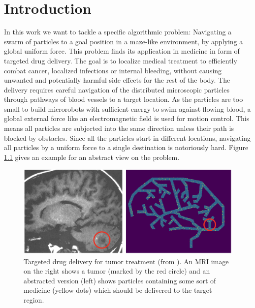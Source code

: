 \chapter{Introduction} \label{chp:Introduction}

 In this work we want to tackle a specific algorithmic problem: Navigating a swarm of particles to a goal position in a maze-like environment, by applying a global uniform force. This problem finds its application in medicine in form of targeted drug delivery. The goal is to localize medical treatment to efficiently combat cancer, localized infections or internal bleeding, without causing unwanted and potentially harmful side effects for the rest of the body. The delivery requires careful navigation of the distributed microscopic particles through pathways of blood vessels to a target location. As the particles are too small to build microrobots with sufficient energy to swim against flowing blood, a global external force like an electromagnetic field is used for motion control. This means all particles are subjected into the same direction unless their path is blocked by obstacles. Since all the particles start in different locations, navigating all particles by a uniform force to a single destination is notoriously hard. Figure \ref{fig:brain_tumor} gives an example for an abstract view on the problem.

 \begin{figure}[ht]
    
    \begin{center}
        \includegraphics[clip, width=0.7\columnwidth]{figures/drugdelivery/brains.png}
    \end{center}
    
    \caption[Targeted Drug Delivery Motivation]{Targeted drug delivery for tumor treatment (from \cite{becker2020}). An MRI image on the right shows a tumor (marked by the red circle) and an abstracted version (left) shows particles containing some sort of medicine (yellow dots) which should be delivered to the target region.}
    \label{fig:brain_tumor}
\end{figure}

